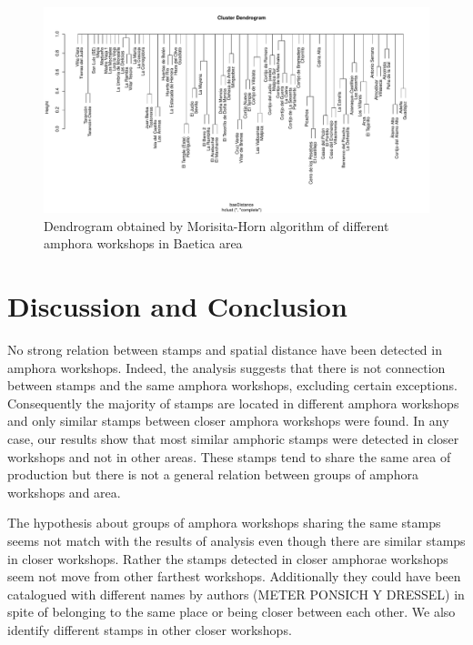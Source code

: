 \documentclass[review]{elsarticle}
\begin{document}
\begin{figure}[htp]
	\centering
\includegraphics[width=\linewidth]{figs/dendro}
\caption{Dendrogram obtained by Morisita-Horn algorithm of different amphora workshops in Baetica area}
\label{dendro}
\end{figure} 





\section{Discussion and Conclusion}

No strong relation between stamps and spatial distance have been detected in amphora workshops. Indeed, the analysis suggests that there is not connection between stamps and the same amphora workshops, excluding certain exceptions. Consequently the majority of stamps are located in different amphora workshops and only similar stamps between closer amphora workshops were found. In any case, our results show that most similar amphoric stamps were detected in closer workshops and not in other areas. These stamps tend to share the same area of production but there is not a general relation between groups of amphora workshops and area. 

The hypothesis about groups of amphora workshops sharing the same stamps seems not match with the results of analysis even though there are similar stamps in closer workshops. Rather the stamps detected in closer amphorae workshops seem not move from other farthest workshops. Additionally they could have been catalogued with different names by authors (METER PONSICH Y DRESSEL) in spite of belonging to the same place or being closer between each other. We also identify different stamps in other closer workshops. 
\end{document}
